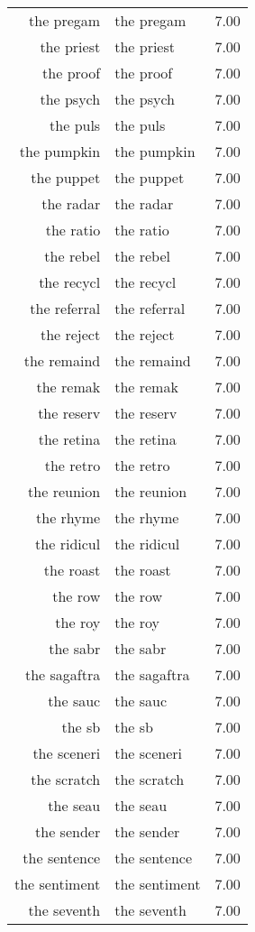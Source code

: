 \begin{table}[ht]
\begin{tabular}{rlr}
  the pregam & the pregam & 7.00 \\ 
  the priest & the priest & 7.00 \\ 
  the proof & the proof & 7.00 \\ 
  the psych & the psych & 7.00 \\ 
  the puls & the puls & 7.00 \\ 
  the pumpkin & the pumpkin & 7.00 \\ 
  the puppet & the puppet & 7.00 \\ 
  the radar & the radar & 7.00 \\ 
  the ratio & the ratio & 7.00 \\ 
  the rebel & the rebel & 7.00 \\ 
  the recycl & the recycl & 7.00 \\ 
  the referral & the referral & 7.00 \\ 
  the reject & the reject & 7.00 \\ 
  the remaind & the remaind & 7.00 \\ 
  the remak & the remak & 7.00 \\ 
  the reserv & the reserv & 7.00 \\ 
  the retina & the retina & 7.00 \\ 
  the retro & the retro & 7.00 \\ 
  the reunion & the reunion & 7.00 \\ 
  the rhyme & the rhyme & 7.00 \\ 
  the ridicul & the ridicul & 7.00 \\ 
  the roast & the roast & 7.00 \\ 
  the row & the row & 7.00 \\ 
  the roy & the roy & 7.00 \\ 
  the sabr & the sabr & 7.00 \\ 
  the sagaftra & the sagaftra & 7.00 \\ 
  the sauc & the sauc & 7.00 \\ 
  the sb & the sb & 7.00 \\ 
  the sceneri & the sceneri & 7.00 \\ 
  the scratch & the scratch & 7.00 \\ 
  the seau & the seau & 7.00 \\ 
  the sender & the sender & 7.00 \\ 
  the sentence & the sentence & 7.00 \\ 
  the sentiment & the sentiment & 7.00 \\ 
  the seventh & the seventh & 7.00 \\ 

\end{tabular}
\end{table}
